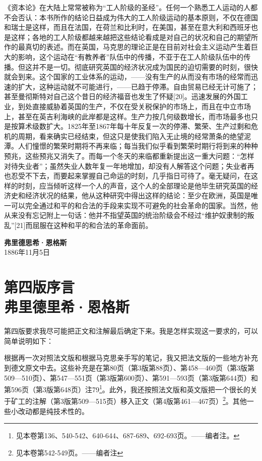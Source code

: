 \documentclass{ctexbook}
\begin{document}
《资本论》在大陆上常常被称为“工人阶级的圣经”。任何一个熟悉工人运动的人都不会否认：本书所作的结论日益成为伟大的工人阶级运动的基本原则，不仅在德国和瑞士是这样，而且在法国，在荷兰和比利时，在美国，甚至在意大利和西班牙也是这样；各地的工人阶级都越来越把这些结论看成是对自己的状况和自己的期望所作的最真切的表述。而在英国，马克思的理论正是在目前对社会主义运动产生着巨大的影响，这个运动在“有教养者”队伍中的传播，不亚于在工人阶级队伍中的传播。但这并不是一切。彻底研究英国的经济状况成为国民的迫切需要的时刻，很快就会到来。这个国家的工业体系的运动，——没有生产的从而没有市场的经常而迅速的扩大，这种运动就不可能进行，——已趋于停滞。自由贸易已经无计可施了；甚至曼彻斯特对自己这个昔日的经济福音也发生了怀疑[20]。迅速发展的外国工业，到处直接威胁着英国的生产，不仅在受关税保护的市场上，而且在中立市场上，甚至在英吉利海峡的此岸都是这样。生产力按几何级数增长，而市场最多也只是按算术级数扩大。1825年至1867年每十年反复一次的停滞、繁荣、生产过剩和危机的周期，看来确实已经结束，但这只是使我们陷入无止境的经常萧条的绝望泥潭。人们憧憬的繁荣时期将不再来临；每当我们似乎看到繁荣时期行将到来的种种预兆，这些预兆又消失了。而每一个冬天的来临都重新提出这一重大问题：“怎样对待失业者”；虽然失业人数年复一年地增加，却没有人解答这个问题；失业者再也忍受不下去，而要起来掌握自己命运的时刻，几乎指日可待了。毫无疑问，在这样的时刻，应当倾听这样一个人的声音，这个人的全部理论是他毕生研究英国的经济史和经济状况的结果，他从这种研究中得出这样的结论：至少在欧洲，英国是唯一可以完全通过和平的和合法的手段来实现不可避免的社会革命的国家。当然，他从来没有忘记附上一句话：他并不指望英国的统治阶级会不经过“维护奴隶制的叛乱”[21]而屈服在这种和平的和合法的革命面前。

\begin{flushright}
    \textbf{弗里德思希·恩格斯}\\
    \small{1886年11月5日}
\end{flushright}


\chapter[弗里德里希·恩格斯\hspace{1em}第四版序言]{第四版序言\\{\small 弗里德里希·恩格斯}}

第四版要求我尽可能把正文和注解最后确定下来。我是怎样实现这一要求的，可以简单说明如下：

根据再一次对照法文版和根据马克思亲手写的笔记，我又把法文版的一些地方补充到德文原文中去。这些补充是在第80页（第3版第88页）、第458—460页（第3版第509—510页）、第547—551页（第3版第600页）、第591—593页（第3版第644页）和第596页（第3版第648页）注79\footnote{见本卷第136、540-542、640-644、687-689、692-693页。——编者注。}。此外，我还按照法文版和英文版把一个很长的关于矿工的注解（第3版第509—515页）移入正文（第4版第461—467页）\footnote{见本卷第542-549页。——编者注}。其他一些小改动都是纯技术性的。
\end{document}
